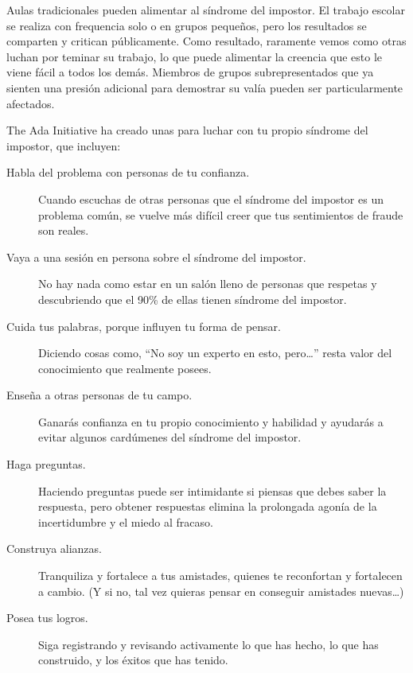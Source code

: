Aulas tradicionales pueden alimentar al síndrome del impostor.
El trabajo escolar se realiza con frequencia solo o en grupos pequeños,
pero los resultados se comparten y critican públicamente.
Como resultado,
raramente vemos como otras luchan por teminar su trabajo,
lo que puede alimentar la creencia que esto le viene fácil a todos los demás.
Miembros de grupos subrepresentados que ya sienten una presión adicional para demostrar su valía
pueden ser particularmente afectados.

The Ada Initiative ha creado unas 
para luchar con tu propio síndrome del impostor,
que incluyen:

\begin{description}

\item[Habla del problema con personas de tu confianza.]
  Cuando escuchas de otras personas que el síndrome del impostor es un problema común,
  se vuelve más difícil creer que tus sentimientos de fraude son reales.

\item[Vaya a una sesión en persona sobre el síndrome del impostor.]
  No hay nada como estar en un salón lleno de personas que respetas
  y descubriendo que el 90\% de ellas tienen síndrome del impostor.

\item[Cuida tus palabras, porque influyen tu forma de pensar.]
  Diciendo cosas como,
  ``No soy un experto en esto, pero{\dots}''
  resta valor del conocimiento que realmente posees.

\item[Enseña a otras personas de tu campo.]
  Ganarás confianza en tu propio conocimiento y habilidad
  y ayudarás a evitar algunos cardúmenes del síndrome del impostor.

\item[Haga preguntas.]
  Haciendo preguntas puede ser intimidante si piensas que debes saber la respuesta,
  pero obtener respuestas elimina la prolongada agonía de la incertidumbre y el miedo al fracaso.

\item[Construya alianzas.]
  Tranquiliza y fortalece a tus amistades,
  quienes te reconfortan y fortalecen a cambio.
  (Y si no, tal vez quieras pensar en conseguir amistades nuevas{\ldots})

\item[Posea tus logros.]
  Siga registrando y revisando activamente lo que has hecho,
  lo que has construido,
  y los éxitos que has tenido.

\end{description}

